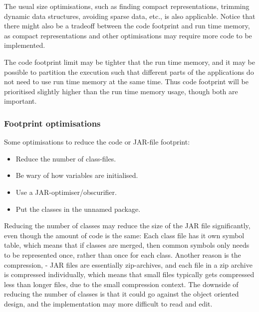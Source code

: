 The usual size optimisations, such as finding compact representations, trimming dynamic data structures, avoiding sparse data, etc., is also applicable.
Notice that there might also be a tradeoff between the code footprint and run time memory, as compact representations and other optimisations may require more code to be implemented.

The code footprint limit may be tighter that the run time memory, and it may be possible to partition the execution such that different parts of the applications do not need to use run time memory at the same time.
Thus code footprint will be prioritised slightly higher than the run time memory usage, though both are important.


\subsubsection{Footprint optimisations}
Some optimisations to reduce the code or JAR-file footprint:
\begin{itemize}
\item Reduce the number of class-files.
\item Be wary of how variables are initialised.
\item Use a JAR-optimiser/obscurifier.
\item Put the classes in the unnamed package.
\end{itemize}

Reducing the number of classes may reduce the size of the JAR file significantly,
even though the amount of code is the same:
Each class file has it own symbol table, which means that if classes are merged, then common symbols only needs to be represented once, rather than once for each class.
Another reason is the compression, - JAR files are essentially zip-archives, and each file in a zip archive is compressed individually\cite{zipspec}, which means that small files typically gets compressed less than longer files, due to the small compression context.
The downside of reducing the number of classes is that it could go against the object oriented design, and the implementation may more difficult to read and edit.

